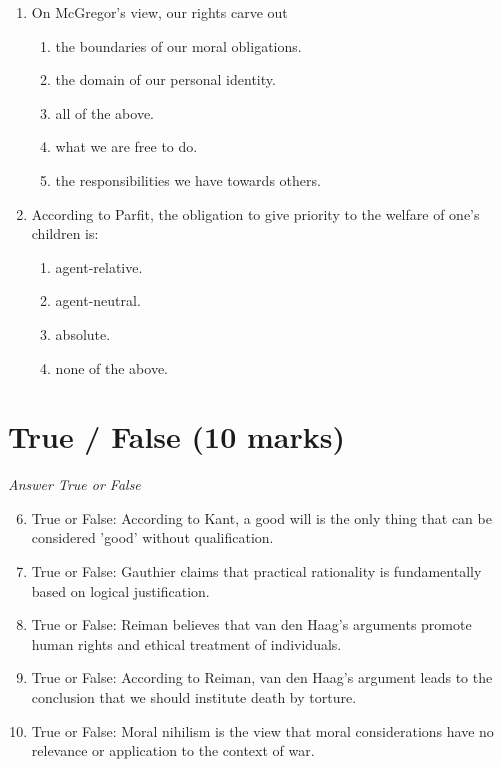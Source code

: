 \documentclass[12pt]{article}
\begin{document}
\begin{enumerate}[label=\arabic*.]
\begin{enumerate}[label=(\alph*)]
    \item human behavior that is driven by basic needs.
\end{enumerate}
\item On McGregor's view, our rights carve out
\begin{enumerate}[label=(\alph*)]
    \item the boundaries of our moral obligations.
    \item the domain of our personal identity.
    \item all of the above.
    \item what we are free to do.
    \item the responsibilities we have towards others.
\end{enumerate}
\item According to Parfit, the obligation to give priority to the welfare of one's children is:
\begin{enumerate}[label=(\alph*)]
    \item agent-relative.
    \item agent-neutral.
    \item absolute.
    \item none of the above.
\end{enumerate}
\end{enumerate}

\section*{True / False (10 marks)}
\textit{Answer True or False}
\begin{enumerate}[label=\arabic*.]
\setcounter{enumi}{5}
\item True or False: According to Kant, a good will is the only thing that can be considered 'good' without qualification.
\item True or False: Gauthier claims that practical rationality is fundamentally based on logical justification.
\item True or False: Reiman believes that van den Haag's arguments promote human rights and ethical treatment of individuals.
\item True or False: According to Reiman, van den Haag's argument leads to the conclusion that we should institute death by torture.
\item True or False: Moral nihilism is the view that moral considerations have no relevance or application to the context of war.
\end{enumerate}
\end{document}
